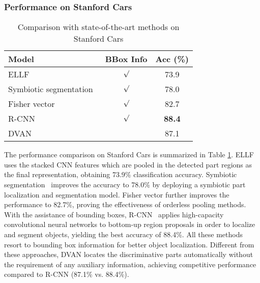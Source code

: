 \documentclass[journal]{IEEEtran}
\begin{document}
\subsubsection{Performance on Stanford Cars}
\begin{table}[!t]
  \centering
  \caption{Comparison with state-of-the-art methods on Stanford Cars}
  \vspace{-0.1in}  
  \label{tab:comparison_cars_2}
  \begin{tabular}{lcc}
    \hline\hline
    Model                   & BBox Info & Acc (\%)\\
    \hline
    ELLF~\cite{ellf}        & $\surd$ & 73.9\\
    Symbiotic segmentation~\cite{symbiotic_segmentation}& $\surd$ & 78.0\\
    Fisher vector~\cite{revisit_fv}    & $\surd$   & 82.7\\
    R-CNN~\cite{rich_feature}          & $\surd$   & \textbf{88.4}\\
    DVAN                               &           & 87.1\\
    \hline\hline
  \end{tabular}
  \vspace{-0.2in}
\end{table}
The performance comparison on Stanford Cars is summarized in Table \ref{tab:comparison_cars_2}. ELLF~\cite{ellf} uses the stacked CNN features which are pooled in the detected part regions as the final representation, obtaining 73.9\% classification accuracy. Symbiotic segmentation~\cite{symbiotic_segmentation} improves the accuracy to 78.0\% by deploying a symbiotic part localization and segmentation model. Fisher vector \cite{revisit_fv} further improves the performance to 82.7\%, proving the effectiveness of orderless pooling methods. With the assistance of bounding boxes, R-CNN~\cite{rich_feature} applies high-capacity convolutional neural networks to bottom-up region proposals in order to localize and segment objects, yielding the best accuracy of 88.4\%. All these methods resort to bounding box information for better object localization. Different from these approaches, DVAN locates the discriminative parts automatically without the requirement of any auxiliary information, achieving competitive performance compared to R-CNN (87.1\% vs. 88.4\%).
\end{document}
